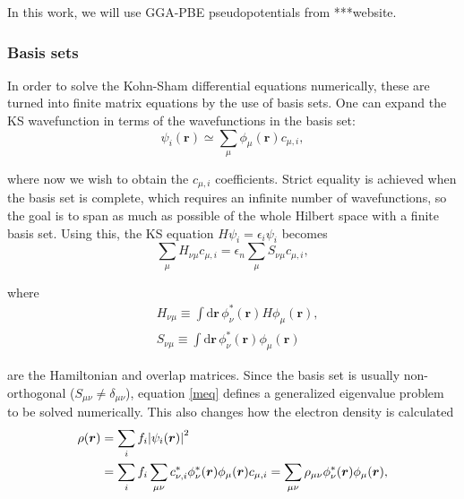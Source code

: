 In this work, we will use GGA-PBE pseudopotentials from ***website.


\subsubsection*{Basis sets}

In order to solve the Kohn-Sham differential equations numerically, these are turned into finite matrix equations by the use of basis sets. One can expand the KS wavefunction in terms of the wavefunctions in the basis set:
\begin{equation}
\psi_i(\bm r) \simeq \sum_\mu\phi_\mu(\bm r)c_{\mu,i},
\end{equation}

where now we wish to obtain the \(c_{\mu,i}\) coefficients. Strict equality is achieved when the basis set is complete, which requires an infinite number of wavefunctions, so the goal is to span as much as possible of the whole Hilbert space with a finite basis set. Using this, the KS equation \(H\psi_i=\epsilon_i\psi_i\) becomes
\begin{equation}
\label{meq}	
\sum_{\mu} H_{\nu \mu} c_{\mu, i}=\epsilon_{n} \sum_{\mu} S_{\nu \mu} c_{\mu, i},
\end{equation}

where
\begin{equation}
	\begin{split}
		&H_{\nu \mu} \equiv \int \mathrm{d} \bm{r}\, \phi_{\nu}^{*}(\mathbf{r}) H \phi_{\mu}(\bm{r}), \\
		&S_{\nu \mu} \equiv \int \mathrm{d} \bm{r}\, \phi_{\nu}^{*}(\mathbf{r}) \phi_{\mu}(\bm{r})
	\end{split}
\end{equation}

are the Hamiltonian and overlap matrices. Since the basis set is usually non-orthogonal (\(S_{\mu\nu}\neq\delta_{\mu\nu}\)), equation \ref{meq} defines a generalized eigenvalue problem to be solved numerically. This also changes how the electron density is calculated
\begin{equation}
\begin{split}
\rho(\bm{r})&=\sum_{i}f_{i}\abs{\psi_{i}(\bm{r})}^{2}\\
&=\sum_{i}f_{i}\sum_{\mu \nu} c_{\nu,i}^{*} \phi_{\nu}^{*}(\bm{r}) \phi_{\mu}(\bm{r}) c_{\mu,i}=\sum_{\mu \nu} \rho_{\mu \nu} \phi_{\nu}^{*}(\bm{r}) \phi_{\mu}(\bm{r}),
\end{split}
\end{equation}

